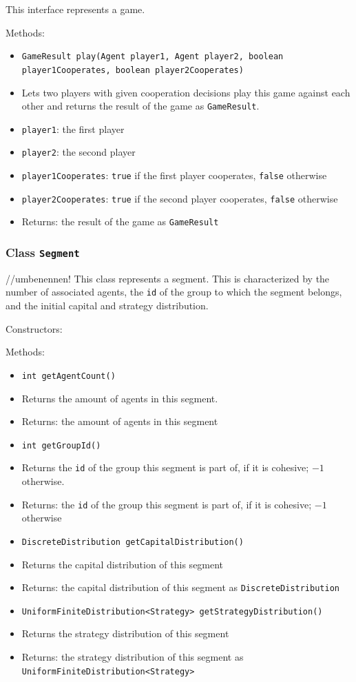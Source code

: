 \documentclass[parskip=full,11pt]{scrartcl}
\begin{document}
This interface represents a game.

Methods:
\begin{itemize}\itemsep -10pt
\item[] \texttt{GameResult play(Agent player1, Agent player2, boolean player1Cooperates, boolean player2Cooperates)}
\item[] Lets two players with given cooperation decisions play this game against each other and returns the result of the game as \texttt{GameResult}.
\item[] \texttt{player1}: the first player
\item[] \texttt{player2}: the second player
\item[] \texttt{player1Cooperates}: \texttt{true} if the first player cooperates, \texttt{false} otherwise
\item[] \texttt{player2Cooperates}: \texttt{true} if the second player cooperates, \texttt{false} otherwise
\item[] Returns: the result of the game as \texttt{GameResult}
\end{itemize}

\subsubsection{Class \texttt{Segment}}
//umbenennen!
This class represents a segment. This is characterized by the number of associated agents, the \texttt{id} of the group to which the segment belongs, and the initial capital and strategy distribution.

Constructors:

Methods:
\begin{itemize}\itemsep -10pt
\item \texttt{int getAgentCount()}
\item[] Returns the amount of agents in this segment.
\item[] Returns: the amount of agents in this segment

\item \texttt{int getGroupId()}
\item[] Returns the \texttt{id} of the group this segment is part of, if it is cohesive; \(-1\) otherwise.
\item[] Returns: the \texttt{id} of the group this segment is part of, if it is cohesive; \(-1\) otherwise

\item \texttt{DiscreteDistribution getCapitalDistribution()}
\item[] Returns the capital distribution of this segment
\item[] Returns: the capital distribution of this segment as \texttt{DiscreteDistribution}

\item \texttt{UniformFiniteDistribution<Strategy> getStrategyDistribution()}
\item[] Returns the strategy distribution of this segment
\item[] Returns: the strategy distribution of this segment as \texttt{UniformFiniteDistribution<Strategy>}
\end{itemize}
\end{document}
